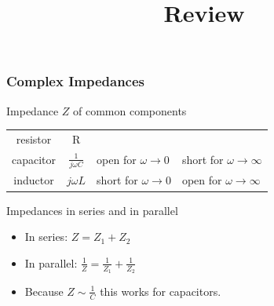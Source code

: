 \documentclass[beamer]{standalone}
\begin{document}
\title[Electronics]{Review}

\begin{frame} 
  \titlepage
\end{frame}

\begin{frame}
 \frametitle{Complex Impedances}
 \begin{block}{Impedance $Z$ of common components}
  \begin{center}
   \begin{tabular}{c|c|l|l}
    resistor & R & \\
    capacitor & $\frac{1}{j\omega C}$ & open for $\omega \to 0$ & short for $\omega \to \infty$ \\
    inductor & $j\omega L$ & short for $\omega \to 0$ & open for $\omega \to \infty$ \\
   \end{tabular}
  \end{center}
 \end{block}
 \begin{block}{Impedances in series and in parallel}
  \begin{itemize}
   \item In series: $Z = Z_1 + Z_2$
   \item In parallel: $\frac{1}{Z} = \frac{1}{Z_1} + \frac{1}{Z_2}$
   \item Because $Z \sim \frac{1}{C}$ this works for capacitors.
  \end{itemize}
 \end{block}
\end{frame}
\end{document}
